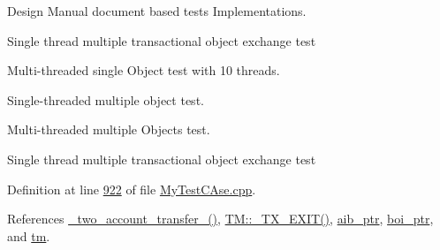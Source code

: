 Design Manual document based tests Implementations. 


\begin{DoxyEnumerate}
\item Single thread multiple transactional object exchange test
\item Multi-\/threaded single Object test with 10 threads.
\item Single-\/threaded multiple object test.
\item Multi-\/threaded multiple Objects test.
\end{DoxyEnumerate}
\begin{DoxyEnumerate}
\item Single thread multiple transactional object exchange test 
\end{DoxyEnumerate}

Definition at line \hyperlink{_my_test_c_ase_8cpp_source_l00922}{922} of file \hyperlink{_my_test_c_ase_8cpp_source}{My\+Test\+C\+Ase.\+cpp}.



References \hyperlink{_my_test_c_ase_8cpp_source_l00266}{\+\_\+two\+\_\+account\+\_\+transfer\+\_\+()}, \hyperlink{_t_m_8cpp_source_l00102}{T\+M\+::\+\_\+\+T\+X\+\_\+\+E\+X\+I\+T()}, \hyperlink{_my_test_c_ase_8h_source_l00066}{aib\+\_\+ptr}, \hyperlink{_my_test_c_ase_8h_source_l00067}{boi\+\_\+ptr}, and \hyperlink{_my_test_c_ase_8h_source_l00065}{tm}.


